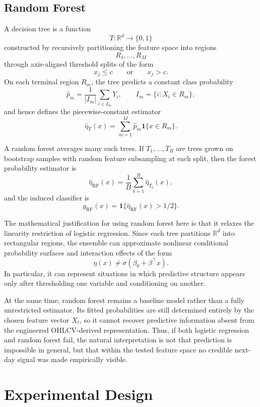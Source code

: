 \documentclass[11pt,a4paper]{article}
\begin{document}
	\subsection{Random Forest}
	
	A decision tree is a function
	\[
	T : \mathbb{R}^d \to \{0,1\}
	\]
	constructed by recursively partitioning the feature space into regions
	\[
	R_1,\dots,R_M
	\]
	through axis-aligned threshold splits of the form
	\[
	x_j \leq c
	\qquad \text{or} \qquad
	x_j > c.
	\]
	On each terminal region \(R_m\), the tree predicts a constant class probability
	\[
	\widehat{p}_m
	=
	\frac{1}{|I_m|}\sum_{i \in I_m} Y_i,
	\qquad
	I_m = \{i : X_i \in R_m\},
	\]
	and hence defines the piecewise-constant estimator
	\[
	\widehat{\eta}_T(x) = \sum_{m=1}^M \widehat{p}_m \mathbf{1}\{x \in R_m\}.
	\]
	
	A random forest averages many such trees. If \(T_1,\dots,T_B\) are trees grown on bootstrap samples with random feature subsampling at each split, then the forest probability estimator is
	\[
	\widehat{\eta}_{\mathrm{RF}}(x)
	=
	\frac{1}{B}\sum_{b=1}^B \widehat{\eta}_{T_b}(x),
	\]
	and the induced classifier is
	\[
	g_{\mathrm{RF}}(x)
	=
	\mathbf{1}\{\widehat{\eta}_{\mathrm{RF}}(x) > 1/2\}.
	\]
	
	The mathematical justification for using random forest here is that it relaxes the linearity restriction of logistic regression. Since each tree partitions \(\mathbb{R}^d\) into rectangular regions, the ensemble can approximate nonlinear conditional probability surfaces and interaction effects of the form
	\[
	\eta(x) \neq \sigma(\beta_0 + \beta^\top x).
	\]
	In particular, it can represent situations in which predictive structure appears only after thresholding one variable and conditioning on another.
	
	At the same time, random forest remains a baseline model rather than a fully unrestricted estimator. Its fitted probabilities are still determined entirely by the chosen feature vector \(X_t\), so it cannot recover predictive information absent from the engineered OHLCV-derived representation. Thus, if both logistic regression and random forest fail, the natural interpretation is not that prediction is impossible in general, but that within the tested feature space no credible next-day signal was made empirically visible.
	
	\section{Experimental Design}
	
\end{document}
